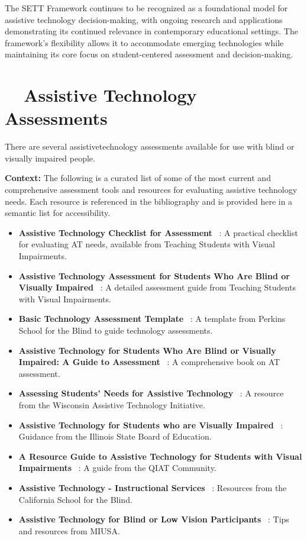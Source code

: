 The SETT Framework continues to be recognized as a foundational model for assistive technology decision-making, with ongoing research and applications demonstrating its continued relevance in contemporary educational settings. The framework's flexibility allows it to accommodate emerging technologies while maintaining its core focus on student-centered assessment and decision-making.

\section{~~Assistive Technology Assessments}\label{app3:trouble4}
There are several \gls{assistivetechnology} assessments available for use with blind or visually impaired people.

\noindent
\textbf{Context:} The following is a curated list of some of the most current and comprehensive assessment tools and resources for evaluating assistive technology needs. Each resource is referenced in the bibliography and is provided here in a semantic list for accessibility.

\begin{itemize}
	\item \textbf{Assistive Technology Checklist for Assessment}~ \supercite{SnowChecklist}: A practical checklist for evaluating AT needs, available from Teaching Students with Visual Impairments.
	\item \textbf{Assistive Technology Assessment for Students Who Are Blind or Visually Impaired}~ \supercite{TeachingAssessment}: A detailed assessment guide from Teaching Students with Visual Impairments.
	\item \textbf{Basic Technology Assessment Template}~ \supercite{PerkinsTemplate}: A template from Perkins School for the Blind to guide technology assessments.
	\item \textbf{Assistive Technology for Students Who Are Blind or Visually Impaired: A Guide to Assessment}~ \supercite{PresleyGuide}: A comprehensive book on AT assessment.
	\item \textbf{Assessing Students' Needs for Assistive Technology}~ \supercite{WATIAssessing}: A resource from the Wisconsin Assistive Technology Initiative.
	\item \textbf{Assistive Technology for Students who are Visually Impaired}~ \supercite{ISBEAssistive}: Guidance from the Illinois State Board of Education.
	\item \textbf{A Resource Guide to Assistive Technology for Students with Visual Impairments}~ \supercite{QIATGuide}: A guide from the QIAT Community.
	\item \textbf{Assistive Technology - Instructional Services}~ \supercite{CSBInstruction}: Resources from the California School for the Blind.
	\item \textbf{Assistive Technology for Blind or Low Vision Participants}~ \supercite{MIUSATips}: Tips and resources from MIUSA.
\end{itemize}

